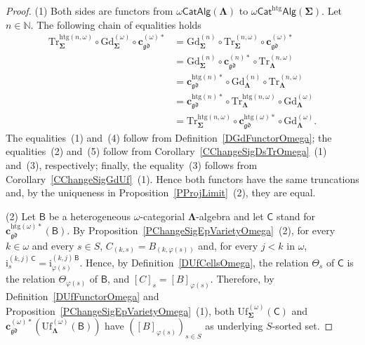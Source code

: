 \documentclass[a4paper, reqno]{amsbook}
\newcommand{\sig}[1]{\mathbf{#1}}             %
\newcommand{\calg}[1]{\boldsymbol{\mathsf{#1}}} %
\newcommand{\gd}{\mathfrak{gd}}              %
\newcommand{\htg}{\mathrm{htg}}                %
\newcommand{\Gd}{\mathrm{Gd}}
\newcommand{\Uf}{\mathrm{Uf}}
\newcommand{\Tr}{\mathrm{Tr}}
\theoremstyle{plain}
\theoremstyle{definition}
\begin{document}
\begin{proof}
(1) Both sides are functors from $\omega\mathsf{CatAlg}(\sig{\Lambda})$ to $\omega\mathsf{Cat}^{\htg}\mathsf{Alg}(\sig{\Sigma})$.
Let $n\in\mathbb{N}$.
The following chain of equalities holds
\begin{align*}
\Tr^{\htg(n,\omega)}_{\sig{\Sigma}}\circ\Gd^{(\omega)}_{\sig{\Sigma}}\circ\mathbf{c}^{(\omega)\ast}_{\gd}
&=
\Gd^{(n)}_{\sig{\Sigma}}\circ\Tr^{(n,\omega)}_{\sig{\Sigma}}\circ\mathbf{c}^{(\omega)\ast}_{\gd}
\tag{1}
\\&=
\Gd^{(n)}_{\sig{\Sigma}}\circ\mathbf{c}^{(n)\ast}_{\gd}\circ\Tr^{(n,\omega)}_{\sig{\Lambda}}
\tag{2}
\\&=
\mathbf{c}^{\htg(n)\ast}_{\gd}\circ\Gd^{(n)}_{\sig{\Lambda}}\circ\Tr^{(n,\omega)}_{\sig{\Lambda}}
\tag{3}
\\&=
\mathbf{c}^{\htg(n)\ast}_{\gd}\circ\Tr^{\htg(n,\omega)}_{\sig{\Lambda}}\circ\Gd^{(\omega)}_{\sig{\Lambda}}
\tag{4}
\\&=
\Tr^{\htg(n,\omega)}_{\sig{\Sigma}}\circ\mathbf{c}^{\htg(\omega)\ast}_{\gd}\circ\Gd^{(\omega)}_{\sig{\Lambda}}.
\tag{5}
\end{align*}
The equalities~(1) and~(4) follow from Definition~\ref{DGdFunctorOmega}; the equalities~(2) and~(5) follow from Corollary~\ref{CChangeSigDsTrOmega}~(1) and~(3), respectively; finally, the equality~(3) follows from Corollary~\ref{CChangeSigGdUf}~(1).
Hence both functors have the same truncations and, by the uniqueness in Proposition~\ref{PProjLimit}~(2), they are equal.

(2) Let $\calg{B}$ be a heterogeneous $\omega$-categorial $\sig{\Lambda}$-algebra and let $\calg{C}$ stand for $\mathbf{c}^{\htg(\omega)\ast}_{\gd}(\calg{B})$.
By Proposition~\ref{PChangeSigEpVarietyOmega}~(2), for every $k\in\omega$ and every $s\in S$, $C_{(k,s)}=B_{(k,\varphi(s))}$ and, for every $j<k$ in $\omega$, $\mathrm{i}^{(k,j)\,\calg{C}}_{s}=\mathrm{i}^{(k,j)\,\calg{B}}_{\varphi(s)}$.
Hence, by Definition~\ref{DUfCellsOmega}, the relation $\Theta_{s}$ of $\calg{C}$ is the relation $\Theta_{\varphi(s)}$ of $\calg{B}$, and $[C]_{s}=[B]_{\varphi(s)}$.
Therefore, by Definition~\ref{DUfFunctorOmega} and Proposition~\ref{PChangeSigEpVarietyOmega}~(1), both $\Uf^{(\omega)}_{\sig{\Sigma}}(\calg{C})$ and $\mathbf{c}^{(\omega)\ast}_{\gd}(\Uf^{(\omega)}_{\sig{\Lambda}}(\calg{B}))$ have $([B]_{\varphi(s)})_{s\in S}$ as underlying $S$-sorted set.


\end{proof}
\end{document}
